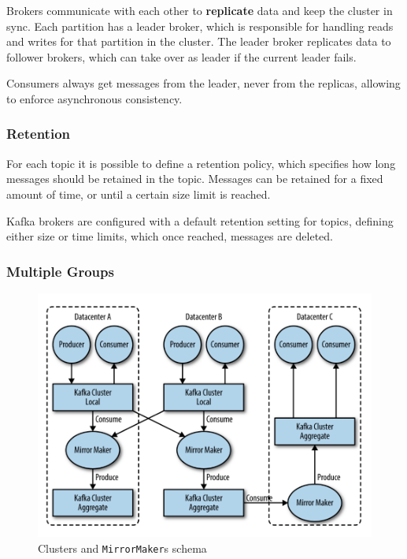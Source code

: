 Brokers communicate with each other to \textbf{replicate} data and keep the cluster in sync. Each partition has a leader broker, which is responsible for handling reads and writes for that partition in the cluster. The leader broker replicates data to follower brokers, which can take over as leader if the current leader fails.

Consumers always get messages from the leader, never from the replicas, allowing to enforce asynchronous consistency.

\subsubsection{Retention}

For each topic it is possible to define a retention policy, which specifies how long messages should be retained in the topic. Messages can be retained for a fixed amount of time, or until a certain size limit is reached.

Kafka brokers are configured with a default retention
setting for topics, defining either size or time limits, which once reached, messages are deleted.


\subsubsection{Multiple Groups}

\begin{figure}[htbp]
   \centering
   \includegraphics{images/16/clusters.png}
   \caption{Clusters and \texttt{MirrorMaker}s schema}
   \label{fig:16/clusters}
\end{figure}

